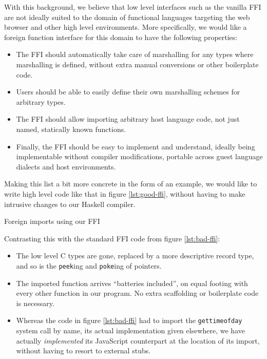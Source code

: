 \documentclass[preprint]{sigplanconf}
\begin{document}
With this background, we believe that low level interfaces such as the
vanilla FFI are not ideally suited  to the domain of functional languages
targeting the web browser and other high level environments.
More specifically, we would like a foreign function interface for this domain
to have the following properties:

\begin{itemize}
\item
  The FFI should automatically take care of marshalling for any types where
  marshalling is defined, without extra manual conversions or other
  boilerplate code.
\item
  Users should be able to easily define their own marshalling schemes for
  arbitrary types.
\item
  The FFI should allow importing arbitrary host language code, not just named,
  statically known functions.
\item
  Finally, the FFI should be easy to implement and understand, ideally being
  implementable without compiler modifications, portable across guest
  language dialects and host environments.
\end{itemize}

Making this list a bit more concrete in the form of an example, we would like
to write high level code like that in figure \ref{lst:good-ffi}, without
having to make intrusive changes to our Haskell compiler.

\begin{listingfloat}
\caption{Foreign imports using our FFI}
\label{lst:good-ffi}
\end{listingfloat}

Contrasting this with the standard FFI code from figure \ref{lst:bad-ffi}:

\begin{itemize}
\item
  The low level C types are gone, replaced by a more descriptive record type,
  and so is the \lstinline!peek!ing and \lstinline!poke!ing of pointers.
\item
  The imported function arrives ``batteries included'', on equal footing with
  every other function in our program. No extra scaffolding or boilerplate
  code is necessary.
\item
  Whereas the code in figure \ref{lst:bad-ffi} had to import the
  \lstinline!gettimeofday! system call by name, its actual implementation
  given elsewhere, we have actually \emph{implemented} its JavaScript
  counterpart at the location of its import, without having to resort to
  external stubs.
\end{itemize}
\end{document}
